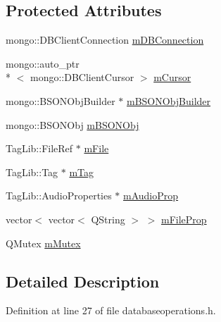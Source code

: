 \subsection*{Protected Attributes}
\begin{DoxyCompactItemize}
\item 
mongo\-::\-D\-B\-Client\-Connection \hyperlink{class_database_operations_a407ee7c24b774c93bd7d915566c84663}{m\-D\-B\-Connection}
\item 
mongo\-::auto\-\_\-ptr\\*
$<$ mongo\-::\-D\-B\-Client\-Cursor $>$ \hyperlink{class_database_operations_a0768987f8c116148aae4175cfc0df6bd}{m\-Cursor}
\item 
mongo\-::\-B\-S\-O\-N\-Obj\-Builder $\ast$ \hyperlink{class_database_operations_ae6604cf6874bd9700ee3158c35945687}{m\-B\-S\-O\-N\-Obj\-Builder}
\item 
mongo\-::\-B\-S\-O\-N\-Obj \hyperlink{class_database_operations_a40636866ce3a84961ed1c241e6ee0885}{m\-B\-S\-O\-N\-Obj}
\item 
Tag\-Lib\-::\-File\-Ref $\ast$ \hyperlink{class_database_operations_af61f0200ac06733bbd9276faf9fa4488}{m\-File}
\item 
Tag\-Lib\-::\-Tag $\ast$ \hyperlink{class_database_operations_a4ee540c45bc895889be44c652693d0e5}{m\-Tag}
\item 
Tag\-Lib\-::\-Audio\-Properties $\ast$ \hyperlink{class_database_operations_a5cf34cf709fe0574fe5101b4f1818a23}{m\-Audio\-Prop}
\item 
vector$<$ vector$<$ Q\-String $>$ $>$ \hyperlink{class_database_operations_a27137305ac34557b97fdffd8e17a9be2}{m\-File\-Prop}
\item 
Q\-Mutex \hyperlink{class_database_operations_a527401ca7671c2856b6368cad0c1c3a7}{m\-Mutex}
\end{DoxyCompactItemize}


\subsection{Detailed Description}


Definition at line 27 of file databaseoperations.\-h.



